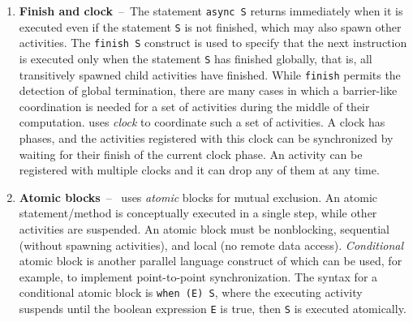 \begin{enumerate}
\item{\bf Finish and clock}~--~The statement {\tt async S} returns immediately when it is executed even if the statement {\tt S} is not finished, which may also spawn other activities. The {\tt finish S} construct is used to specify that the next instruction is executed only when the statement {\tt S} has finished globally, that is, all transitively spawned child activities have finished.
While {\tt finish} permits the detection of global termination, there are many cases in which a barrier-like coordination is needed for a set of activities during the middle of their computation. \Xten{} uses {\em clock} to coordinate such a set of activities. A clock has phases, and the activities registered with this clock can be synchronized by waiting for their finish of the current clock phase. An activity can be registered with multiple clocks and it can drop any of them at any time.
\item{\bf Atomic blocks}~--~\Xten{} uses {\em atomic} blocks for mutual exclusion. An atomic statement/method is conceptually executed in a single step, while other activities are suspended. An atomic block must be nonblocking, sequential (without spawning activities), and local (no remote data access). %
{\em Conditional} atomic block is another parallel language construct of \Xten{} which can be used, for example, to implement point-to-point synchronization. The syntax for a conditional atomic block is {\tt when (E) S}, where the executing activity suspends until the boolean expression {\tt E} is true, then {\tt S} is executed atomically. 
\end{enumerate}



